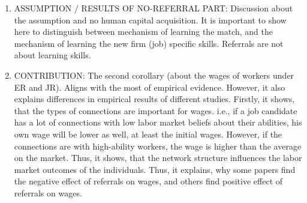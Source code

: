 \documentclass[12pt]{article}
\begin{document}
\begin{enumerate}
    \item ASSUMPTION / RESULTS OF NO-REFERRAL PART: Discussion about the assumption and no human capital acquisition. It is important to show here to distinguish between mechanism of learning the match, and the mechanism of learning the new firm (job) specific skills. Referrals are not about learning skills.
    \item CONTRIBUTION: The second corollary (about the wages of workers under ER and JR). Aligns with the most of empirical evidence. However, it also explains differences in empirical results of different studies. Firstly, it shows, that the types of connections are important for wages. i.e., if a job candidate has a lot of connections with low labor market beliefs about their abilities, his own wage will be lower as well, at least the initial wages. However, if the connections are with high-ability workers, the wage is higher than the average on the market. Thus, it shows, that the network structure influences the labor market outcomes of the individuals. Thus, it explains, why some papers find the negative effect of referrals on wages, and others find positive effect of referrals on wages. 


\end{enumerate}
\end{document}
